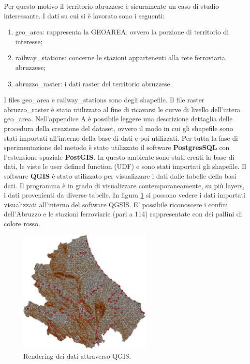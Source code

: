 Per questo motivo il territorio abruzzese è sicuramente un caso di studio interessante.
I dati su cui si è lavorato sono i seguenti:
\begin{enumerate}
	\item geo\_area: rappresenta la GEOAREA, ovvero la porzione di territorio di interesse;
	\item railway\_stations: concerne le stazioni appartenenti alla rete ferroviaria abruzzese;
	\item abruzzo\_raster: i dati raster del territorio abruzzese.
\end{enumerate}
I files geo\_area e railway\_stations  sono degli shapefile. Il file raster abruzzo\_raster è stato utilizzato al fine di ricavarsi le curve di livello dell'intera geo\_area. Nell'appendice A è possibile leggere una descrizione dettaglia delle procedura della creazione del dataset, ovvero il modo in cui gli shapefile sono stati importati all'interno della base di dati e poi utilizzati.
Per tutta la fase di sperimentazione del metodo è stato utilizzato il software \textbf{PostgresSQL} con l’estensione spaziale \textbf{PostGIS}. In questo ambiente sono stati creati la base di dati, le viste le user defined function (UDF) e sono stati importati gli shapefile. Il software \textbf{QGIS} è stato utilizzato per visualizzare i dati dalle tabelle della basi dati. Il programma è in grado di visualizzare contemporaneamente, su più layers, i dati provenienti da diverse tabelle. In figura \ref{qgis} si possono vedere i dati importati visualizzati all'interno del software QGSIS. E' possibile riconoscere i confini dell'Abruzzo e le stazioni ferroviarie (pari a 114) rappresentate con dei pallini di colore rosso.

\begin{figure}[h]
	\centering
	\includegraphics[width=0.6\textwidth]{images/dati_abruzzo_stazione}
	\caption{Rendering dei dati attraverso QGIS.}
	\label{qgis}
\end{figure}

